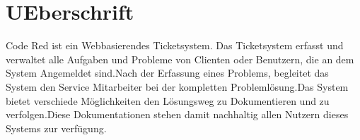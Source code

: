 \chapter{UEberschrift}  %
\label{chapter:UEberschrift}  %

Code Red ist ein Webbasierendes Ticketsystem. Das Ticketsystem erfasst und verwaltet alle Aufgaben und Probleme von Clienten oder Benutzern, die an dem System Angemeldet sind.Nach der Erfassung eines Problems, begleitet das System den Service Mitarbeiter bei der kompletten Problemlösung.Das System bietet verschiede Möglichkeiten den Lösungsweg zu Dokumentieren und zu verfolgen.Diese Dokumentationen stehen damit nachhaltig allen Nutzern dieses Systems zur verfügung.